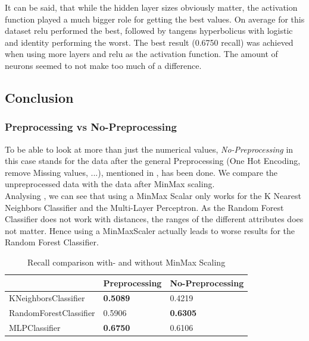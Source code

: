 \newline
It can be said, that while the hidden layer sizes obviously matter, the activation function played a much bigger role for getting the best values. On average for this dataset relu performed the best, followed by tangens hyperbolicus with logistic and identity performing the worst. The best result (0.6750 recall) was achieved when using more layers and relu as the activation function. The amount of neurons seemed to not make too much of a difference.


\subsection{Conclusion}
\subsubsection{Preprocessing vs No-Preprocessing}
To be able to look at more than just the numerical values, \textit{No-Preprocessing} in this case stands for the data after the general Preprocessing (One Hot Encoding, remove Missing values, ...), mentioned in , has been done. We compare the unpreprocessed data with the data after MinMax scaling.\\%
\newline
Analysing , we can see that using a MinMax Scalar only works for the K Nearest Neighbors Classifier and the Multi-Layer Perceptron. As the Random Forest Classifier does not work with distances,  the ranges of the different attributes does not matter. Hence using a MinMaxScaler actually leads to worse results for the Random Forest Classifier.


\begin{table}[h]
\begin{center}
\begin{tabular}{|l|l|l|}
\hline
                       & Preprocessing & No-Preprocessing \\ \hline
KNeighborsClassifier   & \textbf{0.5089}        & 0.4219          \\ \hline
RandomForestClassifier & 0.5906        & \textbf{0.6305}           \\ \hline
MLPClassifier          & \textbf{0.6750}        & 0.6106           \\ \hline
\end{tabular}
\caption{Recall comparison with- and without MinMax Scaling}
\label{tab:onl_pre_no_pre}
\end{center}
\end{table}

